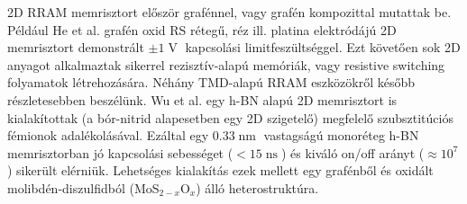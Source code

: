 \documentclass[twoside]{article}
\DeclareMathOperator\V{V}
\DeclareMathOperator\nm{nm}
\DeclareMathOperator\ns{ns}
\begin{document}
2D RRAM memrisztort először grafénnel, vagy grafén kompozittal mutattak be\cite{yin2021}. Például He et al. grafén oxid RS rétegű, réz ill. platina elektródájú 2D memrisztort demonstrált $\pm 1\V$ kapcsolási limitfeszültséggel\cite{he2009}. Ezt követően sok 2D anyagot alkalmaztak sikerrel rezisztív-alapú memóriák, vagy resistive switching folyamatok létrehozására. Néhány TMD-alapú RRAM eszközökről később részletesebben beszélünk. Wu et al. egy h-BN alapú 2D memrisztort is kialakítottak (a bór-nitrid alapesetben egy 2D szigetelő) megfelelő szubsztitúciós fémionok adalékolásával\cite{wu2019}. Ezáltal egy $0.33\nm$ vastagságú monoréteg h-BN memrisztorban jó kapcsolási sebességet ($< 15\ns$) és kiváló on/off arányt ($\approx 10^7$) sikerült elérniük. Lehetséges kialakítás ezek mellett egy grafénből és oxidált molibdén-diszulfidból (MoS$_{2-x}$O$_x$) álló heterostruktúra\cite{wang20182d}.
\end{document}
